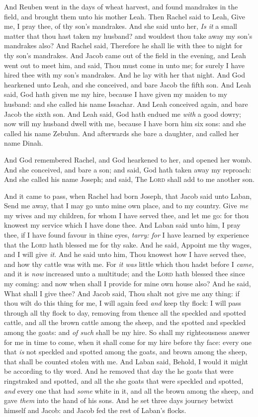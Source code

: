 \documentclass[11pt,letterpaper,oneside]{memoir}
\begin{document}
And Reuben went in the days of wheat harvest, and found mandrakes in the
field, and brought them unto his mother Leah. Then Rachel said to Leah,
Give me, I pray thee, of thy son's mandrakes. And she said unto her,
\emph{Is it} a small matter that thou hast taken my husband? and
wouldest thou take away my son's mandrakes also? And Rachel said,
Therefore he shall lie with thee to night for thy son's mandrakes. And
Jacob came out of the field in the evening, and Leah went out to meet
him, and said, Thou must come in unto me; for surely I have hired thee
with my son's mandrakes. And he lay with her that night. And God
hearkened unto Leah, and she conceived, and bare Jacob the fifth son.
And Leah said, God hath given me my hire, because I have given my maiden
to my husband: and she called his name Issachar. And Leah conceived
again, and bare Jacob the sixth son. And Leah said, God hath endued me
\emph{with} a good dowry; now will my husband dwell with me, because I
have born him six sons: and she called his name Zebulun. And afterwards
she bare a daughter, and called her name Dinah.

And God remembered Rachel, and God hearkened to her, and opened her
womb. And she conceived, and bare a son; and said, God hath taken away
my reproach: And she called his name Joseph; and said, The \textsc{Lord}
shall add to me another son.

And it came to pass, when Rachel had born Joseph, that Jacob said unto
Laban, Send me away, that I may go unto mine own place, and to my
country. Give \emph{me} my wives and my children, for whom I have served
thee, and let me go: for thou knowest my service which I have done thee.
And Laban said unto him, I pray thee, if I have found favour in thine
eyes, \emph{tarry: for} I have learned by experience that the
\textsc{Lord} hath blessed me for thy sake. And he said, Appoint me thy
wages, and I will give \emph{it. }And he said unto him, Thou knowest how
I have served thee, and how thy cattle was with me. For \emph{it was}
little which thou hadst before I \emph{came,} and it is \emph{now}
increased unto a multitude; and the \textsc{Lord} hath blessed thee since
my coming: and now when shall I provide for mine own house also? And he
said, What shall I give thee? And Jacob said, Thou shalt not give me any
thing: if thou wilt do this thing for me, I will again feed \emph{and}
keep thy flock: I will pass through all thy flock to day, removing from
thence all the speckled and spotted cattle, and all the brown cattle
among the sheep, and the spotted and speckled among the goats: and
\emph{of such} shall be my hire. So shall my righteousness answer for me
in time to come, when it shall come for my hire before thy face: every
one that \emph{is} not speckled and spotted among the goats, and brown
among the sheep, that shall be counted stolen with me. And Laban said,
Behold, I would it might be according to thy word. And he removed that
day the he goats that were ringstraked and spotted, and all the she
goats that were speckled and spotted, \emph{and} every one that had
\emph{some} white in it, and all the brown among the sheep, and gave
\emph{them} into the hand of his sons. And he set three days journey
betwixt himself and Jacob: and Jacob fed the rest of Laban's flocks.
\end{document}
